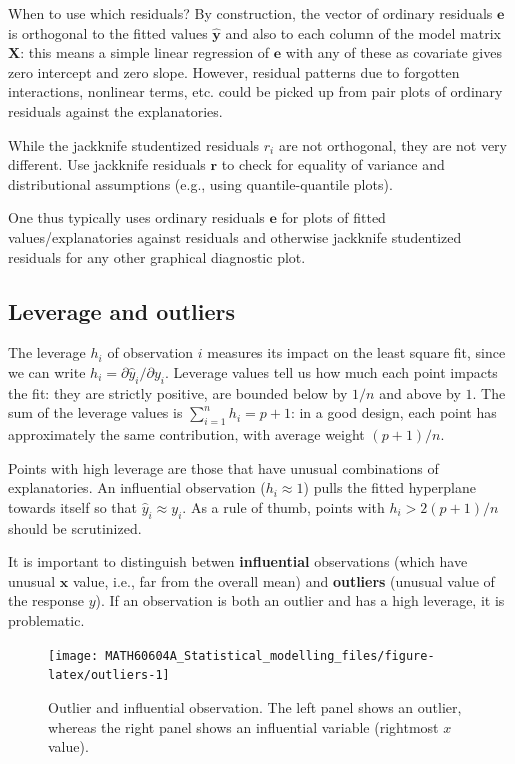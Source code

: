 \documentclass[
  11pt,
  letterpaper,
]{book}
\theoremstyle{definition}
\theoremstyle{definition}
\theoremstyle{definition}
\theoremstyle{remark}
\begin{document}
When to use which residuals? By construction, the vector of ordinary residuals \(\boldsymbol{e}\) is orthogonal to the fitted values \(\widehat{\boldsymbol{y}}\) and also to each column of the model matrix \(\mathbf{X}\): this means a simple linear regression of \(\boldsymbol{e}\) with any of these as covariate gives zero intercept and zero slope. However, residual patterns due to forgotten interactions, nonlinear terms, etc. could be picked up from pair plots of ordinary residuals against the explanatories.

While the jackknife studentized residuals \(r_i\) are not orthogonal, they are not very different. Use jackknife residuals \(\boldsymbol{r}\) to check for equality of variance and distributional assumptions (e.g., using quantile-quantile plots).

One thus typically uses ordinary residuals \(\boldsymbol{e}\) for plots of fitted values/explanatories against residuals and otherwise jackknife studentized residuals for any other graphical diagnostic plot.

\hypertarget{leverage-and-outliers}{%
\subsection{Leverage and outliers}\label{leverage-and-outliers}}

The leverage \(h_i\) of observation \(i\) measures its impact on the least square fit, since we can write \(h_i = \partial \widehat{y}_i/\partial y_i\). Leverage values tell us how much each point impacts the fit: they are strictly positive, are bounded below by \(1/n\) and above by \(1\). The sum of the leverage values is \(\sum_{i=1}^n h_i=p+1\): in a good design, each point has approximately the same contribution, with average weight \((p+1)/n\).

Points with high leverage are those that have unusual combinations of explanatories. An influential observation (\(h_i\approx 1\)) pulls the fitted hyperplane towards itself so that \(\hat{y}_i \approx y_i\). As a rule of thumb, points with \(h_i> 2(p+1)/n\) should be scrutinized.

It is important to distinguish betwen \textbf{influential} observations (which have unusual \(\mathbf{x}\) value, i.e., far from the overall mean) and \textbf{outliers} (unusual value of the response \(y\)).
If an observation is both an outlier and has a high leverage, it is problematic.

\begin{figure}

{\centering \texttt{[image: MATH60604A\_Statistical\_modelling\_files/figure-latex/outliers-1]} 

}

\caption{Outlier and influential observation. The left panel shows an outlier, whereas the right panel shows an influential variable (rightmost $x$ value).}\label{fig:outliers}
\end{figure}
\end{document}

